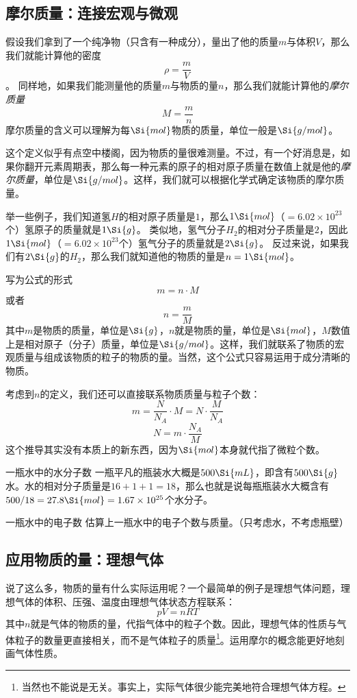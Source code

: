 \subsection{摩尔质量：连接宏观与微观}
假设我们拿到了一个纯净物（只含有一种成分），量出了他的质量$m$与体积$V$，那么我们就能计算他的密度
$$\rho = \frac{m}{V}$$。
同样地，如果我们能测量他的质量$m$与物质的量$n$，那么我们就能计算他的\textsl{摩尔质量}
$$M = \frac{m}{n}$$
摩尔质量的含义可以理解为每$\Si{mol}$物质的质量，单位一般是$\Si{g/mol}$。

这个定义似乎有点空中楼阁，因为物质的量很难测量。不过，有一个好消息是，如果你翻开元素周期表，那么每一种元素的原子的相对原子质量在数值上就是他的\textsl{摩尔质量}，单位是$\Si{g/mol}$。这样，我们就可以根据化学式确定该物质的摩尔质量。

举一些例子，我们知道氢$H$的相对原子质量是$1$，那么$1 \Si{mol}$（$=6.02\times 10^{23}$个）氢原子的质量就是$1 \Si{g}$。
类似地，氢气分子$H_2$的相对分子质量是$2$，因此$1 \Si{mol}$（$=6.02\times 10^{23}$个）氢气分子的质量就是$2 \Si{g}$。
反过来说，如果我们有$2 \Si{g}$的$H_2$，那么我们就知道他的物质的量是$n=1 \Si{mol}$。

写为公式的形式
$$m = n \cdot M$$
或者
$$n = \frac{m}{M}$$
其中$m$是物质的质量，单位是$\Si{g}$，$n$就是物质的量，单位是$\Si{mol}$，$M$数值上是相对原子（分子）质量，单位是$\Si{g/mol}$。这样，我们就联系了物质的宏观质量与组成该物质的粒子的物质的量。当然，这个公式只容易运用于成分清晰的物质。

考虑到$n$的定义，我们还可以直接联系物质质量与粒子个数：
$$m = \frac{N}{N_A} \cdot M = N \cdot \frac{M}{N_A}$$
$$N = m \cdot \frac{N_A}{M}$$
这个推导其实没有本质上的新东西，因为$\Si{mol}$本身就代指了微粒个数。

\begin{example}{一瓶水中的水分子数}
一瓶平凡的瓶装水大概是$500 \Si{mL}$，即含有$500 \Si{g}$水。水的相对分子质量是$16+1+1=18$，那么也就是说每瓶瓶装水大概含有$500/18=27.8 \Si{mol} = 1.67 \times 10^{25}$个水分子。
\end{example}

\begin{exercise}{一瓶水中的电子数}
估算上一瓶水中的电子个数与质量。（只考虑水，不考虑瓶壁）
\end{exercise}

\subsection{应用物质的量：理想气体}
说了这么多，物质的量有什么实际运用呢？一个最简单的例子是理想气体问题，理想气体的体积、压强、温度由理想气体状态方程联系：
$$pV=nRT$$
其中$n$就是气体的物质的量，代指气体中的粒子个数。因此，理想气体的性质与气体粒子的数量更直接相关，而不是气体粒子的质量\footnote{当然也不能说是无关。事实上，实际气体很少能完美地符合理想气体方程。}。运用摩尔的概念能更好地刻画气体性质。

